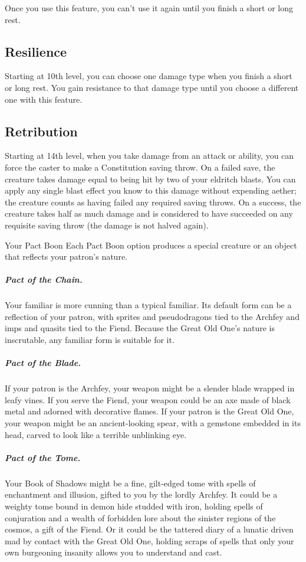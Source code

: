 Once you use this feature, you can't use it again until you finish a short or long rest.

\subsection{Resilience}

Starting at 10th level, you can choose one damage type when you finish a short or long rest. You gain resistance to that damage type until you choose a different one with this feature.

\subsection{Retribution}

Starting at 14th level, when you take damage from an attack or ability, you can force the caster to make a Constitution saving throw. On a failed save, the creature takes damage equal to being hit by two of your eldritch blasts. You can apply any single blast effect you know to this damage without expending aether; the creature counts as having failed any required saving throws. On a success, the creature takes half as much damage and is considered to have succeeded on any requisite saving throw (the damage is not halved again).

\begin{DndComment}{Your Pact Boon}
    Each Pact Boon option produces a special creature or an object that reflects your patron's nature.
    
    \subparagraph*{Pact of the Chain.} Your familiar is more cunning than a typical familiar. Its default form can be a reflection of your patron, with sprites and pseudodragons tied to the Archfey and imps and quasits tied to the Fiend. Because the Great Old One's nature is inscrutable, any familiar form is suitable for it.
    
    \subparagraph*{Pact of the Blade.} If your patron is the Archfey, your weapon might be a slender blade wrapped in leafy vines. If you serve the Fiend, your weapon could be an axe made of black metal and adorned with decorative flames. If your patron is the Great Old One, your weapon might be an ancient-looking spear, with a gemstone embedded in its head, carved to look like a terrible unblinking eye.
    
    \subparagraph*{Pact of the Tome.} Your Book of Shadows might be a fine, gilt-edged tome with spells of enchantment and illusion, gifted to you by the lordly Archfey. It could be a weighty tome bound in demon hide studded with iron, holding spells of conjuration and a wealth of forbidden lore about the sinister regions of the cosmos, a gift of the Fiend. Or it could be the tattered diary of a lunatic driven mad by contact with the Great Old One, holding scraps of spells that only your own burgeoning insanity allows you to understand and cast.    
\end{DndComment}
